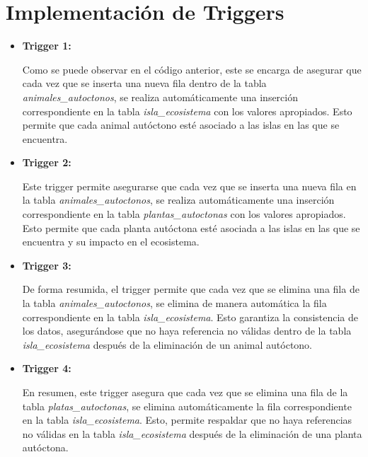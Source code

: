 \documentclass[11pt]{report}
\begin{document}
\section{Implementación de Triggers}
\begin{itemize}
      \item \textbf{Trigger 1:} 
            \lstset{style=mystyle}
            

Como se puede observar en el código anterior, este se encarga de asegurar que cada vez que se inserta una nueva fila dentro de la tabla \emph{animales\_autoctonos}, se realiza automáticamente una inserción correspondiente en la tabla \emph{isla\_ecosistema} con los valores apropiados. Esto permite que cada animal autóctono esté asociado a las islas en las que se encuentra.

      \item \textbf{Trigger 2:} 
            \lstset{style=mystyle}
            

Este trigger permite asegurarse que cada vez que se inserta una nueva fila en la tabla \emph{animales\_autoctonos}, se realiza automáticamente una inserción correspondiente en la tabla \emph{plantas\_autoctonas} con los valores apropiados. Esto permite que cada planta autóctona esté asociada a las islas en las que se encuentra y su impacto en el ecosistema.

      \item \textbf{Trigger 3:} 
            \lstset{style=mystyle}
            

De forma resumida, el trigger permite que cada vez que se elimina una fila de la tabla \emph{animales\_autoctonos}, se elimina de manera automática la fila correspondiente en la tabla \emph{isla\_ecosistema}. Esto garantiza la consistencia de los datos, asegurándose que no haya referencia no válidas dentro de la tabla \emph{isla\_ecosistema} después de la eliminación de un animal autóctono.

      \item \textbf{Trigger 4:} 
            \lstset{style=mystyle}
            

En resumen, este trigger asegura que cada vez que se elimina una fila de la tabla \emph{platas\_autoctonas}, se elimina automáticamente la fila correspondiente en la tabla \emph{isla\_ecosistema}. Esto, permite respaldar que no haya referencias no válidas en la tabla \emph{isla\_ecosistema} después de la eliminación de una planta autóctona.


\end{itemize}
\end{document}
